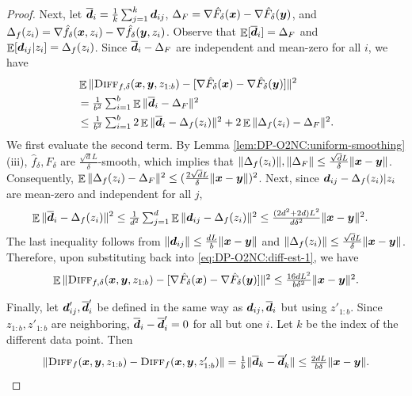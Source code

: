 \begin{proof}
Next, let $\overline{{\boldsymbol{d}}}_i = \frac{1}{k}\sum_{j=1}^k{\boldsymbol{d}}_{ij}$, $\Delta_F = \nabla\hat F_\delta({\boldsymbol{x}}) - \nabla\hat F_\delta({\boldsymbol{y}})$, and $\Delta_{f}(z_i) = \nabla\hat f_\delta({\boldsymbol{x}},z_i)-\nabla\hat f_\delta({\boldsymbol{y}},z_i)$. Observe that $\mathop{\mathbb{E}}[\overline{{\boldsymbol{d}}}_i] = \Delta_F$ and $\mathop{\mathbb{E}}[{\boldsymbol{d}}_{ij}|z_i] = \Delta_f(z_i)$.
Since $\overline{{\boldsymbol{d}}}_i - \Delta_F$ are independent and mean-zero for all $i$, we have
\begin{align}
    &\mathop{\mathbb{E}}\| {\normalfont\textsc{Diff}}_{f,\delta}({\boldsymbol{x}},{\boldsymbol{y}},z_{1:b}) - [\nabla\hat F_\delta({\boldsymbol{x}}) - \nabla\hat F_\delta({\boldsymbol{y}})] \|^2 \notag\\
    &= \textstyle \frac{1}{b^2}\sum_{i=1}^b \mathop{\mathbb{E}}\| \overline{{\boldsymbol{d}}}_i - \Delta_F \|^2 \notag\\
    &\le \textstyle \frac{1}{b^2}\sum_{i=1}^b 2\mathop{\mathbb{E}}\|\overline{{\boldsymbol{d}}}_i - \Delta_f(z_i)\|^2 + 2\mathop{\mathbb{E}}\|\Delta_f(z_i) - \Delta_F\|^2. 
    \label{eq:DP-O2NC:diff-est-1}
\end{align}
We first evaluate the second term.
By Lemma \ref{lem:DP-O2NC:uniform-smoothing} (iii), $\hat f_\delta, F_\delta$ are $\frac{\sqrt{d}L}{\delta}$-smooth, which implies that $\|\Delta_f(z_i)\|, \|\Delta_F\| \le \frac{\sqrt{d}L}{\delta}\|{\boldsymbol{x}}-{\boldsymbol{y}}\|$. Consequently, $\mathop{\mathbb{E}}\|\Delta_f(z_i)-\Delta_F\|^2 \le (\frac{2\sqrt{d}L}{\delta}\|{\boldsymbol{x}}-{\boldsymbol{y}}\|)^2$. 
Next, since ${\boldsymbol{d}}_{ij}-\Delta_f(z_i)|z_i$ are mean-zero and independent for all $j$,
\begin{align*}
    \mathop{\mathbb{E}}\|\overline{{\boldsymbol{d}}}_i - \Delta_f(z_i)\|^2 
    &\le \textstyle \frac{1}{d^2}\sum_{j=1}^d \mathop{\mathbb{E}}\|{\boldsymbol{d}}_{ij} - \Delta_f(z_i)\|^2 \le \frac{(2d^2+2d)L^2}{d\delta^2}\|{\boldsymbol{x}}-{\boldsymbol{y}}\|^2.
\end{align*}
The last inequality follows from $\|{\boldsymbol{d}}_{ij}\| \le \frac{dL}{b}\|{\boldsymbol{x}}-{\boldsymbol{y}}\|$ and $\|\Delta_f(z_i)\| \le \frac{\sqrt{d}L}{\delta}\|{\boldsymbol{x}}-{\boldsymbol{y}}\|$.
Therefore, upon substituting back into \eqref{eq:DP-O2NC:diff-est-1}, we have
\begin{equation*}
    \textstyle
    \mathop{\mathbb{E}}\| {\normalfont\textsc{Diff}}_{f,\delta}({\boldsymbol{x}},{\boldsymbol{y}},z_{1:b}) - [\nabla\hat F_\delta({\boldsymbol{x}}) - \nabla\hat F_\delta({\boldsymbol{y}})] \|^2
    \le \frac{16dL^2}{b\delta^2}\|{\boldsymbol{x}}-{\boldsymbol{y}}\|^2. 
\end{equation*}

Finally, let ${\boldsymbol{d}}'_{ij},\overline{{\boldsymbol{d}}}'_i$ be defined in the same way as ${\boldsymbol{d}}_{ij}, \overline{{\boldsymbol{d}}}_i$ but using $z'_{1:b}$. Since $z_{1:b},z'_{1:b}$ are neighboring, $\overline{{\boldsymbol{d}}}_i-\overline{{\boldsymbol{d}}}_i' = 0$ for all but one $i$. Let $k$ be the index of the different data point. Then 
\begin{equation*}
    \textstyle
    \|{\normalfont\textsc{Diff}}_f({\boldsymbol{x}},{\boldsymbol{y}},z_{1:b}) - {\normalfont\textsc{Diff}}_f({\boldsymbol{x}},{\boldsymbol{y}},z_{1:b}')\|
    = \frac{1}{b}\|\overline{{\boldsymbol{d}}}_k - \overline{{\boldsymbol{d}}}_k'\| \le \frac{2dL}{b\delta}\|{\boldsymbol{x}}-{\boldsymbol{y}}\|. \qedhere
\end{equation*}
\end{proof}